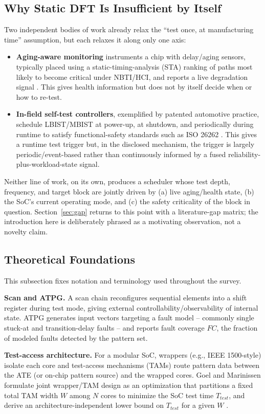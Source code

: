 \documentclass[journal]{IEEEtran}
\begin{document}
\subsection{Why Static DFT Is Insufficient by Itself}
Two independent bodies of work already relax the ``test once, at manufacturing time'' assumption, but each relaxes it along only one axis:
\begin{itemize}
\item \textbf{Aging-aware monitoring} instruments a chip with delay/aging sensors, typically placed using a static-timing-analysis (STA) ranking of paths most likely to become critical under NBTI/HCI, and reports a live degradation signal \cite{r4,r5,r6}. This gives health information but does not by itself decide when or how to re-test.
\item \textbf{In-field self-test controllers}, exemplified by patented automotive practice, schedule LBIST/MBIST at power-up, at shutdown, and periodically during runtime to satisfy functional-safety standards such as ISO 26262 \cite{r9,r10}. This gives a runtime test trigger but, in the disclosed mechanism, the trigger is largely periodic/event-based rather than continuously informed by a fused reliability-plus-workload-state signal.
\end{itemize}
Neither line of work, on its own, produces a scheduler whose test depth, frequency, and target block are jointly driven by (a) live aging/health state, (b) the SoC's current operating mode, and (c) the safety criticality of the block in question. Section~\ref{sec:gap} returns to this point with a literature-gap matrix; the introduction here is deliberately phrased as a motivating observation, not a novelty claim.

\subsection{Theoretical Foundations}
This subsection fixes notation and terminology used throughout the survey.

\textbf{Scan and ATPG.} A scan chain reconfigures sequential elements into a shift register during test mode, giving external controllability/observability of internal state. ATPG generates input vectors targeting a fault model -- commonly single stuck-at and transition-delay faults -- and reports fault coverage $FC$, the fraction of modeled faults detected by the pattern set.

\textbf{Test-access architecture.} For a modular SoC, wrappers (e.g., IEEE 1500-style) isolate each core and test-access mechanisms (TAMs) route pattern data between the ATE (or on-chip pattern source) and the wrapped cores. Goel and Marinissen formulate joint wrapper/TAM design as an optimization that partitions a fixed total TAM width $W$ among $N$ cores to minimize the SoC test time $T_{test}$, and derive an architecture-independent lower bound on $T_{test}$ for a given $W$ \cite{r1}.
\end{document}
